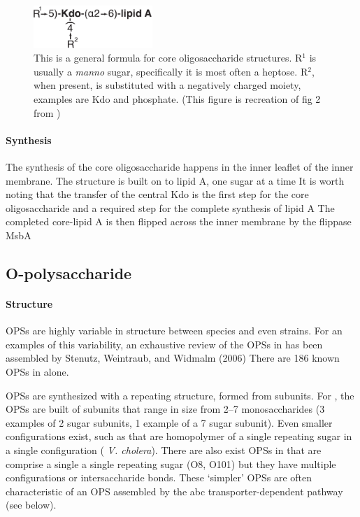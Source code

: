 \begin{figure}[htb]
  	\begin{center}
   		\includegraphics[width=0.4\textwidth]{intro/img/coreformula.pdf}
   	\end{center}
   	\caption[A generalized formula for core oligosaccharides]{This is a general formula for core oligosaccharide structures. R$^1$ is usually a \textit{manno} sugar, specifically
it is most often a heptose. R$^2$, when present, is substituted with a negatively charged moiety, examples are Kdo and phosphate. (This figure is recreation of fig 2 from
) }
\label{fig:coreformula}
\end{figure}

    \paragraph{Synthesis} The synthesis of the core oligosaccharide happens in the inner leaflet of the inner membrane. The structure is built on to lipid A, one sugar at a
time It is worth noting that the transfer of the central Kdo is the first step for the core oligosaccharide and a required step for the complete
synthesis of lipid A The completed core-lipid A is then flipped across the inner membrane by the flippase MsbA

  \subsection{O-polysaccharide}\label{sec:o-polysaccharide}

    \paragraph{Structure} \Acp{OPS} are highly variable in structure between species and even strains. For an examples of this variability, an exhaustive review of the \acp{OPS} in
\ecoli has been assembled by Stenutz, Weintraub, and Widmalm (2006) There are 186 known \acp{OPS} in \ecoli alone.

\Acp{OPS} are synthesized with a repeating structure, formed from subunits. For \ecoli, the \acp{OPS} are built of subunits that range in size from 2--7 monosaccharides (3 examples
of 2 sugar subunits, 1 example of a 7 sugar subunit). Even smaller configurations exist, such as that are homopolymer of a single repeating sugar in a single configuration (\eg
\textit{V. cholera}). There are also exist \acp{OPS} in \ecoli that are comprise a single a single repeating sugar (O8, O101) but they have multiple
configurations or intersaccharide bonds. These `simpler' \acp{OPS} are often characteristic of an \ac{OPS} assembled by the \ac{abc} transporter-dependent pathway (see below).
 
